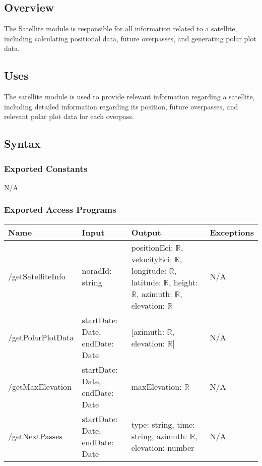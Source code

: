 \documentclass[12pt, titlepage]{article}
\begin{document}
\subsection{Overview}

The Satellite module is responsible for all information related to a satellite, including calculating positional data, future overpasses, and generating polar plot data. 

\subsection{Uses}

The satellite module is used to provide relevant information regarding a satellite, including detailed information regarding its position, future overpasses, and relevant polar plot data for each overpass.

\subsection{Syntax}

\subsubsection{Exported Constants}

N/A

\subsubsection{Exported Access Programs}

\begin{center}
\begin{tabular}{|p{4cm} |p{3cm} |p{5cm} |p{4cm}|}
\hline
\textbf{Name} & \textbf{Input} & \textbf{Output} & \textbf{Exceptions} \\
\hline
/getSatelliteInfo & noradId: string & positionEci: $\mathbb{R}$,
 velocityEci: $\mathbb{R}$,
longitude: $\mathbb{R}$,
latitude: $\mathbb{R}$,
height: $\mathbb{R}$,
azimuth: $\mathbb{R}$,
elevation: $\mathbb{R}$ & N/A \\
\hline
/getPolarPlotData & startDate: Date, endDate: Date & [azimuth: $\mathbb{R}$, elevation: $\mathbb{R}$] & N/A \\
\hline
/getMaxElevation & startDate: Date, endDate: Date & maxElevation: $\mathbb{R}$ & N/A \\
\hline
/getNextPasses & startDate: Date, endDate: Date & type: string, time: string, azimuth: $\mathbb{R}$, elevation: number & N/A \\
\hline

\end{tabular}

\end{center}
\end{document}
